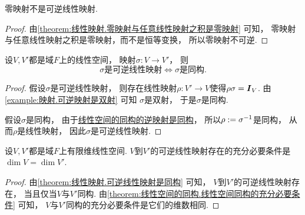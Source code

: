 \begin{proposition}\label{theorem:线性映射.零映射不可逆}
零映射不是可逆线性映射.
\begin{proof}
由\cref{theorem:线性映射.零映射与任意线性映射之积是零映射} 可知，
零映射与任意线性映射之积是零映射，而不是恒等变换，
所以零映射不可逆.
\end{proof}
\end{proposition}

\begin{proposition}\label{theorem:线性映射.可逆线性映射是同构}
设\(V,V'\)都是域\(F\)上的线性空间，
映射\(\sigma\colon V \to V'\)，
则\begin{equation*}
	\text{$\sigma$是可逆线性映射}
	\iff
	\text{$\sigma$是同构}.
\end{equation*}
\begin{proof}
假设\(\sigma\)是可逆线性映射，
则存在线性映射\(\rho\colon V' \to V\)使得\(\rho\sigma = \boldsymbol{I}_V\).
由\cref{example:映射.可逆映射是双射} 可知
\(\sigma\)是双射，
于是\(\sigma\)是同构.

假设\(\sigma\)是同构，
由于\hyperref[theorem:线性空间.线性空间的同构的逆是同构]{线性空间的同构的逆映射是同构}，
所以\(\rho := \sigma^{-1}\)是同构，
从而\(\rho\)是线性映射，
因此\(\sigma\)是可逆线性映射.
\end{proof}
\end{proposition}

\begin{proposition}%
设\(V,V'\)都是域\(F\)上有限维线性空间.
\(V\)到\(V'\)的可逆线性映射存在的充分必要条件是
\(\dim V=\dim V'\).
\begin{proof}
由\cref{theorem:线性映射.可逆线性映射是同构} 可知，
\(V\)到\(V'\)的可逆线性映射存在，
当且仅当\(V\)与\(V'\)同构.
由\cref{theorem:线性空间的同构.线性空间同构的充分必要条件} 可知，
\(V\)与\(V'\)同构的充分必要条件是它们的维数相同.
\end{proof}
\end{proposition}

